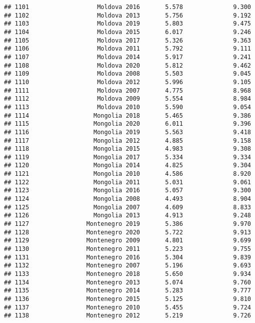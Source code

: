 \documentclass[
]{article}
\begin{document}
\begin{verbatim}
## 1101                   Moldova 2016       5.578              9.300
## 1102                   Moldova 2013       5.756              9.192
## 1103                   Moldova 2019       5.803              9.475
## 1104                   Moldova 2015       6.017              9.246
## 1105                   Moldova 2017       5.326              9.363
## 1106                   Moldova 2011       5.792              9.111
## 1107                   Moldova 2014       5.917              9.241
## 1108                   Moldova 2020       5.812              9.462
## 1109                   Moldova 2008       5.503              9.045
## 1110                   Moldova 2012       5.996              9.105
## 1111                   Moldova 2007       4.775              8.968
## 1112                   Moldova 2009       5.554              8.984
## 1113                   Moldova 2010       5.590              9.054
## 1114                  Mongolia 2018       5.465              9.386
## 1115                  Mongolia 2020       6.011              9.396
## 1116                  Mongolia 2019       5.563              9.418
## 1117                  Mongolia 2012       4.885              9.158
## 1118                  Mongolia 2015       4.983              9.308
## 1119                  Mongolia 2017       5.334              9.334
## 1120                  Mongolia 2014       4.825              9.304
## 1121                  Mongolia 2010       4.586              8.920
## 1122                  Mongolia 2011       5.031              9.061
## 1123                  Mongolia 2016       5.057              9.300
## 1124                  Mongolia 2008       4.493              8.904
## 1125                  Mongolia 2007       4.609              8.833
## 1126                  Mongolia 2013       4.913              9.248
## 1127                Montenegro 2019       5.386              9.970
## 1128                Montenegro 2020       5.722              9.913
## 1129                Montenegro 2009       4.801              9.699
## 1130                Montenegro 2011       5.223              9.755
## 1131                Montenegro 2016       5.304              9.839
## 1132                Montenegro 2007       5.196              9.693
## 1133                Montenegro 2018       5.650              9.934
## 1134                Montenegro 2013       5.074              9.760
## 1135                Montenegro 2014       5.283              9.777
## 1136                Montenegro 2015       5.125              9.810
## 1137                Montenegro 2010       5.455              9.724
## 1138                Montenegro 2012       5.219              9.726

\end{verbatim}
\end{document}
